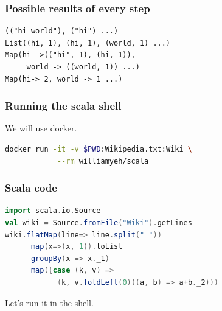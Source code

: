 \documentclass{beamer}
\begin{document}
\begin{frame}[fragile]
\frametitle{Possible results of every step}
\begin{lstlisting}[language={},numbers=none,linebackgroundcolor={
      \btLstHL<1>{1}%
      \btLstHL<2>{2}%
      \btLstHL<3>{3,4}%
      \btLstHL<4>{5}%
    }]
(("hi world"), ("hi") ...)
List((hi, 1), (hi, 1), (world, 1) ...)
Map(hi ->(("hi", 1), (hi, 1)),
     world -> ((world, 1)) ...)
Map(hi-> 2, world -> 1 ...)
\end{lstlisting}
\end{frame}

\begin{frame}[fragile]
\frametitle{Running the scala shell}

We will use docker.

\begin{lstlisting}[language=bash,numbers=none]
docker run -it -v $PWD:Wikipedia.txt:Wiki \
            --rm williamyeh/scala
\end{lstlisting}
\end{frame}

\begin{frame}[fragile]
  \frametitle{Scala code}

\begin{lstlisting}[language=Scala,linebackgroundcolor={
      \btLstHL<1>{2}%
      \btLstHL<2>{3}%
      \btLstHL<3>{4}%
      \btLstHL<4>{5}%
      \btLstHL<5>{6,7}%
    }]
import scala.io.Source
val wiki = Source.fromFile("Wiki").getLines
wiki.flatMap(line=> line.split(" "))
      map(x=>(x, 1)).toList
      groupBy(x => x._1)
      map({case (k, v) =>
            (k, v.foldLeft(0)((a, b) => a+b._2)))
  \end{lstlisting}

\end{frame}

\begin{frame}

  \center
  {\huge Let's run it in the shell.}

\end{frame}
\end{document}
